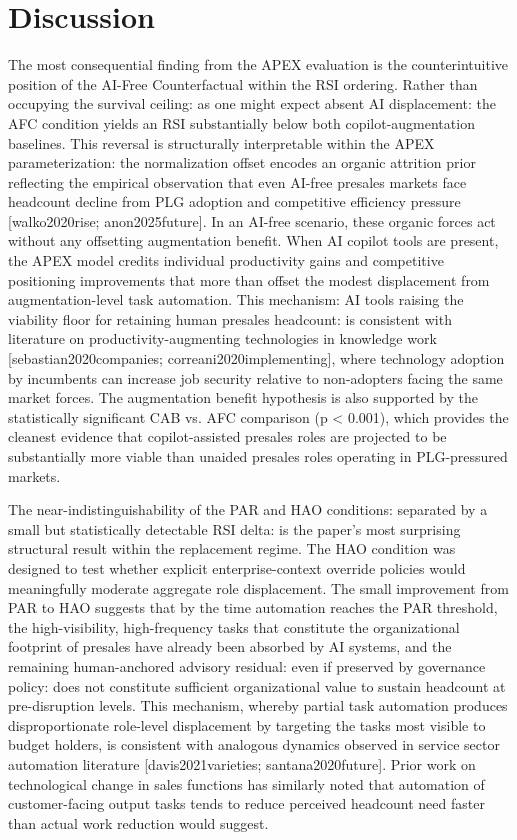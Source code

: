 \documentclass[10pt, conference]{IEEEtran}
\begin{document}
\section{Discussion}

\label{sec:discussion}

The most consequential finding from the APEX evaluation is the counterintuitive position of the AI-Free Counterfactual within the RSI ordering. Rather than occupying the survival ceiling: as one might expect absent AI displacement: the AFC condition yields an RSI substantially below both copilot-augmentation baselines. This reversal is structurally interpretable within the APEX parameterization: the normalization offset encodes an organic attrition prior reflecting the empirical observation that even AI-free presales markets face headcount decline from PLG adoption and competitive efficiency pressure [walko2020rise; anon2025future]. In an AI-free scenario, these organic forces act without any offsetting augmentation benefit. When AI copilot tools are present, the APEX model credits individual productivity gains and competitive positioning improvements that more than offset the modest displacement from augmentation-level task automation. This mechanism: AI tools raising the viability floor for retaining human presales headcount: is consistent with literature on productivity-augmenting technologies in knowledge work [sebastian2020companies; correani2020implementing], where technology adoption by incumbents can increase job security relative to non-adopters facing the same market forces. The augmentation benefit hypothesis is also supported by the statistically significant CAB vs. AFC comparison (p < 0.001), which provides the cleanest evidence that copilot-assisted presales roles are projected to be substantially more viable than unaided presales roles operating in PLG-pressured markets.

The near-indistinguishability of the PAR and HAO conditions: separated by a small but statistically detectable RSI delta: is the paper's most surprising structural result within the replacement regime. The HAO condition was designed to test whether explicit enterprise-context override policies would meaningfully moderate aggregate role displacement. The small improvement from PAR to HAO suggests that by the time automation reaches the PAR threshold, the high-visibility, high-frequency tasks that constitute the organizational footprint of presales have already been absorbed by AI systems, and the remaining human-anchored advisory residual: even if preserved by governance policy: does not constitute sufficient organizational value to sustain headcount at pre-disruption levels. This mechanism, whereby partial task automation produces disproportionate role-level displacement by targeting the tasks most visible to budget holders, is consistent with analogous dynamics observed in service sector automation literature [davis2021varieties; santana2020future]. Prior work on technological change in sales functions \cite{groene2024introduction} has similarly noted that automation of customer-facing output tasks tends to reduce perceived headcount need faster than actual work reduction would suggest.
\end{document}
